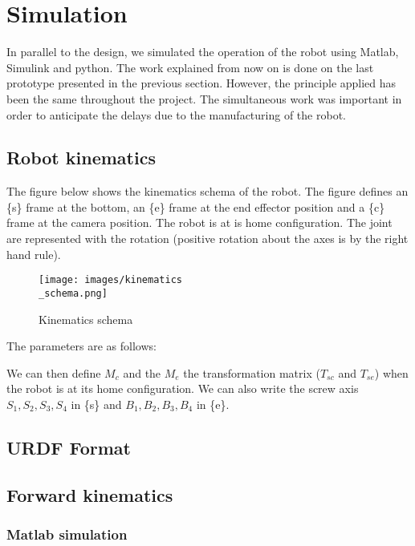 \section{Simulation}

\hspace{\parindent} In parallel to the design, we simulated the operation of the robot using Matlab, Simulink and python. The work explained from now on is done on the last prototype presented in the previous section. However, the principle applied has been the same throughout the project. The simultaneous work was important in order to anticipate the delays due to the manufacturing of the robot. 

\subsection{Robot kinematics}

\hspace{\parindent} The figure below shows the kinematics schema of the robot. The figure defines an \{s\} frame at the bottom, an \{e\} frame at the end effector position and a \{c\} frame at the camera position. The robot is at is home configuration. The joint are represented with the rotation (positive rotation about the axes is by the right hand rule).

\begin{figure}[ht]
    \centering
    \texttt{[image: images/kinematics\\\_schema.png]}
    \caption{Kinematics schema}
    \label{fig:mesh10}
\end{figure}

The parameters are as follows: 

\bigbreak

We can then define $M_c$ and the $M_e$ the transformation matrix ($T_{sc}$ and $T_{se}$) when the robot is at its home configuration. We can also write the screw axis $S_1,S_2,S_3,S_4$ in \{s\} and $B_1,B_2,B_3,B_4$ in \{e\}.

\subsection{URDF Format}

\subsection{Forward kinematics}
\subsubsection{Matlab simulation}

